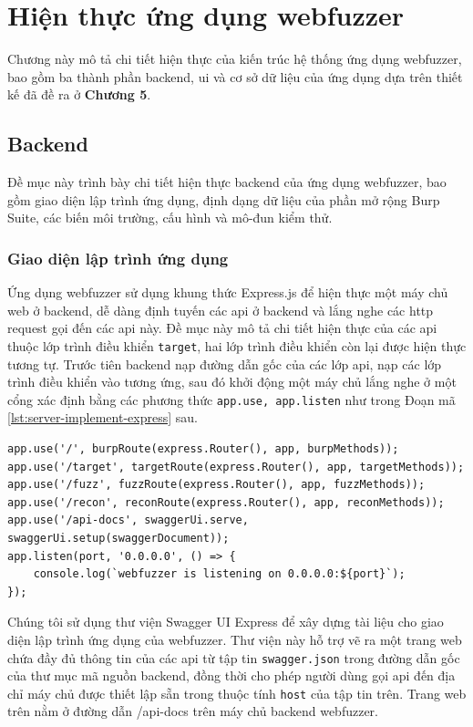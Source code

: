 \chapter{Hiện thực ứng dụng webfuzzer}
Chương này mô tả chi tiết hiện thực của kiến trúc hệ thống ứng dụng webfuzzer, bao gồm ba thành phần backend, \acrshort{ui} và cơ sở dữ liệu của ứng dụng dựa trên thiết kế đã đề ra ở \textbf{Chương 5}.
\section{Backend}
Đề mục này trình bày chi tiết hiện thực backend của ứng dụng webfuzzer, bao gồm giao diện lập trình ứng dụng, định dạng dữ liệu của phần mở rộng Burp Suite, các biến môi trường, cấu hình và mô-đun kiểm thử.
\subsection{Giao diện lập trình ứng dụng}
Ứng dụng webfuzzer sử dụng khung thức Express.js để hiện thực một máy chủ web ở backend, dễ dàng định tuyến các \acrshort{api} ở backend và lắng nghe các \acrshort{http} request gọi đến các \acrshort{api} này. Đề mục này mô tả chi tiết hiện thực của các \acrshort{api} thuộc lớp trình điều khiển \texttt{target}, hai lớp trình điều khiển còn lại được hiện thực tương tự. Trước tiên backend nạp đường dẫn gốc của các lớp \acrshort{api}, nạp các lớp trình điều khiển vào tương ứng, sau đó khởi động một máy chủ lắng nghe ở một cổng xác định bằng các phương thức \texttt{app.use, app.listen} như trong Đoạn mã \ref{lst:server-implement-express} sau.
\begin{lstlisting}[style=ES6, label={lst:server-implement-express}, caption={Thiết lập đường dẫn gốc của các \acrshort{api} và khởi động backend}]
app.use('/', burpRoute(express.Router(), app, burpMethods));
app.use('/target', targetRoute(express.Router(), app, targetMethods));
app.use('/fuzz', fuzzRoute(express.Router(), app, fuzzMethods));
app.use('/recon', reconRoute(express.Router(), app, reconMethods));
app.use('/api-docs', swaggerUi.serve, swaggerUi.setup(swaggerDocument));
app.listen(port, '0.0.0.0', () => {
    console.log(`webfuzzer is listening on 0.0.0.0:${port}`);
});
\end{lstlisting}
Chúng tôi sử dụng thư viện Swagger UI Express để xây dựng tài liệu cho giao diện lập trình ứng dụng của webfuzzer. Thư viện này hỗ trợ vẽ ra một trang web chứa đầy đủ thông tin của các \acrshort{api} từ tập tin \texttt{swagger.json} trong đường dẫn gốc của thư mục mã nguồn backend, đồng thời cho phép người dùng gọi \acrshort{api} đến địa chỉ máy chủ được thiết lập sẵn trong thuộc tính \texttt{host} của tập tin trên. Trang web trên nằm ở đường dẫn \colorbox{gray!30}{/api-docs} trên máy chủ backend webfuzzer.\par
